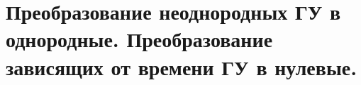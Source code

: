 \section{Преобразование неоднородных ГУ в однородные. Преобразование зависящих
от времени ГУ в нулевые.}

\newpage
